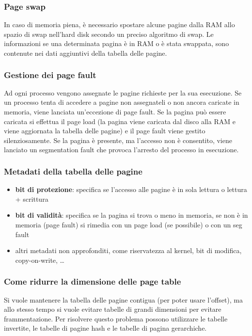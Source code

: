 \documentclass[a4paper]{article}
\begin{document}
\subsubsection*{Page swap}
In caso di memoria piena, è necessario spostare alcune pagine dalla RAM allo spazio di swap nell'hard disk secondo un preciso
algoritmo di swap. Le informazioni se una determinata pagina è in RAM o è stata swappata, sono contenute nei dati aggiuntivi
della tabella delle pagine.

\subsubsection*{Gestione dei page fault}
Ad ogni processo vengono assegnate le pagine richieste per la sua esecuzione. Se un processo tenta di accedere a pagine non
assegnateli o non ancora caricate in memoria, viene lanciata un'eccezione di page fault. Se la pagina può essere caricata si
effettua il page load (la pagina viene caricata dal disco alla RAM e viene aggiornata la tabella delle pagine) e il page fault
viene gestito silenziosamente. Se la pagina è presente, ma l'accesso non è consentito, viene lanciato un segmentation fault che
provoca l'arresto del processo in esecuzione.

\subsubsection*{Metadati della tabella delle pagine}
\begin{itemize}
	\item \textbf{bit di protezione}: specifica se l'accesso alle pagine è in sola lettura o lettura + scrittura
	\item \textbf{bit di validità}: specifica se la pagina si trova o meno in memoria, se non è in memoria (page fault) si
	rimedia con un page load (se possibile) o con un seg fault
	\item altri metadati non approfonditi, come riservatezza al kernel, bit di modifica, copy-on-write, \dots
\end{itemize}

\subsubsection*{Come ridurre la dimensione delle page table}
Si vuole mantenere la tabella delle pagine contigua (per poter usare l'offset), ma allo stesso tempo si vuole evitare tabelle di
grandi dimensioni per evitare frammentazione. Per risolvere questo problema possono utilizzare le tabelle invertite, le tabelle
di pagine hash e le tabelle di pagina gerarchiche.
\end{document}
